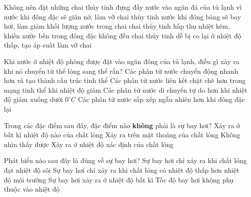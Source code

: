 \begin{ex} 
	Không nên đặt những chai thủy tinh đựng đầy nước vào ngăn đá của tủ lạnh vì
	\choice
	{\True nước khi đông đặc sẽ giãn nở, làm vỡ chai thủy tinh}
	{nước khi đóng băng sẽ bay hơi, làm giảm khối lượng nước trong chai}
	{chai thủy tinh hấp thụ nhiệt kém, khiến nước bên trong đông đặc không đều}
	{chai thủy tinh dễ bị co lại ở nhiệt độ thấp, tạo áp suất làm vỡ chai}
\end{ex}

\begin{ex} 
	Khi nước ở nhiệt độ phòng được đặt vào ngăn đông của tủ lạnh, điều gì xảy ra khi nó chuyển từ thể lỏng sang thể rắn?
	\choice
	{Các phân tử nước chuyển động nhanh hơn và tạo thành cấu trúc tinh thể}
	{\True Các phân tử nước liên kết chặt chẽ hơn trong mạng tinh thể khi nhiệt độ giảm}
	{Các phân tử nước di chuyển tự do hơn khi nhiệt độ giảm xuống dưới $0^\circ C$}
	{Các phân tử nước sắp xếp ngẫu nhiên hơn khi đông đặc lại}
\end{ex}











\begin{ex} 
	Trong các đặc điểm sau đây, đặc điểm nào \textbf{không} phải là sự bay hơi?
	\choice
	{Xảy ra ở bất kì nhiệt độ nào của chất lỏng}
	{Xảy ra trên mặt thoáng của chất lỏng}
	{Không nhìn thấy được}
	{\True Xảy ra ở nhiệt độ xác định của chất lỏng}
\end{ex}

\begin{ex} 
	Phát biểu nào sau đây là đúng về sự bay hơi?
	\choice
	{Sự bay hơi chỉ xảy ra khi chất lỏng đạt nhiệt độ sôi}
	{Sự bay hơi chỉ xảy ra khi chất lỏng có nhiệt độ thấp hơn nhiệt độ môi trường}
	{\True Sự bay hơi xảy ra ở nhiệt độ bất kì}
	{Tốc độ bay hơi không phụ thuộc vào nhiệt độ}
\end{ex}

